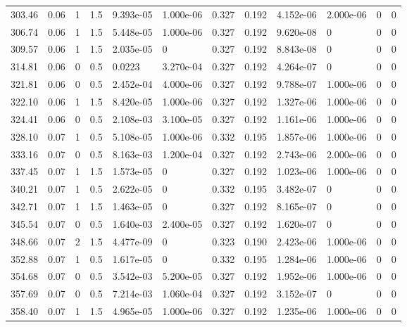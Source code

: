 \documentclass[preview]{standalone}
\begin{document}
{{{\begin{tabular}{L{1.2cm}C{1.2cm} C{0.3cm}C{0.5cm} C{1.4cm}C{1.4cm} C{1.4cm}C{1.4cm} C{1.6cm}C{1.6cm} C{1.6cm}C{1.6cm}}
  303.46  &  0.06  & 1     & 1.5 &  9.393e-05  & 1.000e-06  &  0.327&   0.192& 4.152e-06 & 2.000e-06   &  0 & 0  \\ 
  306.74  &  0.06  & 1     & 1.5 &  5.448e-05  & 1.000e-06  &  0.327&   0.192& 9.620e-08 & 0   &  0 & 0  \\ 
  309.57  &  0.06  & 1     & 1.5 &  2.035e-05  & 0  &  0.327&   0.192& 8.843e-08 & 0   &  0 & 0  \\ 
  314.81  &  0.06  & 0     & 0.5 &  0.0223  & 3.270e-04  &  0.327&   0.192& 4.264e-07 & 0   &  0 & 0  \\ 
  321.81  &  0.06  & 0     & 0.5 &  2.452e-04  & 4.000e-06  &  0.327&   0.192& 9.788e-07 & 1.000e-06   &  0 & 0  \\ 
  322.10  &  0.06  & 1     & 1.5 &  8.420e-05  & 1.000e-06  &  0.327&   0.192& 1.327e-06 & 1.000e-06   &  0 & 0  \\ 
  324.41  &  0.06  & 0     & 0.5 &  2.108e-03  & 3.100e-05  &  0.327&   0.192& 1.161e-06 & 1.000e-06   &  0 & 0  \\ 
  328.10  &  0.07  & 1     & 0.5 &  5.108e-05  & 1.000e-06  &  0.332&   0.195& 1.857e-06 & 1.000e-06   &  0 & 0  \\ 
  333.16  &  0.07  & 0     & 0.5 &  8.163e-03  & 1.200e-04  &  0.327&   0.192& 2.743e-06 & 2.000e-06   &  0 & 0  \\ 
  337.45  &  0.07  & 1     & 1.5 &  1.573e-05  & 0  &  0.327&   0.192& 1.023e-06 & 1.000e-06   &  0 & 0  \\ 
  340.21  &  0.07  & 1     & 0.5 &  2.622e-05  & 0  &  0.332&   0.195& 3.482e-07 & 0   &  0 & 0  \\ 
  342.71  &  0.07  & 1     & 1.5 &  1.463e-05  & 0  &  0.327&   0.192& 8.165e-07 & 0   &  0 & 0  \\ 
  345.54  &  0.07  & 0     & 0.5 &  1.640e-03  & 2.400e-05  &  0.327&   0.192& 1.620e-07 & 0   &  0 & 0  \\ 
  348.66  &  0.07  & 2     & 1.5 &  4.477e-09  & 0  &  0.323&   0.190& 2.423e-06 & 1.000e-06   &  0 & 0  \\ 
  352.88  &  0.07  & 1     & 0.5 &  1.617e-05  & 0  &  0.332&   0.195& 1.284e-06 & 1.000e-06   &  0 & 0  \\ 
  354.68  &  0.07  & 0     & 0.5 &  3.542e-03  & 5.200e-05  &  0.327&   0.192& 1.952e-06 & 1.000e-06   &  0 & 0  \\ 
  357.69  &  0.07  & 0     & 0.5 &  7.214e-03  & 1.060e-04  &  0.327&   0.192& 3.152e-07 & 0   &  0 & 0  \\ 
  358.40  &  0.07  & 1     & 1.5 &  4.965e-05  & 1.000e-06  &  0.327&   0.192& 1.235e-06 & 1.000e-06   &  0 & 0  \\ 

\end{tabular}}}}
\end{document}
